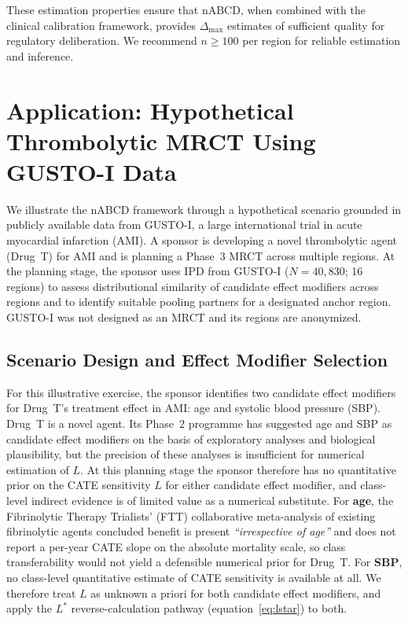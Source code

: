 \documentclass[AMA,Times1COL]{WileyNJDv5}
\begin{document}
These estimation properties ensure that nABCD, when combined with the clinical calibration framework, provides $\Delta_{\max}$ estimates of sufficient quality for regulatory deliberation. We recommend $n \geq 100$ per region for reliable estimation and inference.

\section{Application: Hypothetical Thrombolytic MRCT Using GUSTO-I Data}\label{sec:application}

We illustrate the nABCD framework through a hypothetical scenario grounded in publicly available data from GUSTO-I, a large international trial in acute myocardial infarction (AMI). A sponsor is developing a novel thrombolytic agent (Drug~T) for AMI and is planning a Phase~3 MRCT across multiple regions. At the planning stage, the sponsor uses IPD from GUSTO-I ($N = 40{,}830$; 16 regions)\cite{gusto1993} to assess distributional similarity of candidate effect modifiers across regions and to identify suitable pooling partners for a designated anchor region. GUSTO-I was not designed as an MRCT and its regions are anonymized.

\subsection{Scenario Design and Effect Modifier Selection}\label{sec:app_scenario}

For this illustrative exercise, the sponsor identifies two candidate effect modifiers for Drug~T's treatment effect in AMI: age and systolic blood pressure (SBP). Drug~T is a novel agent. Its Phase~2 programme has suggested age and SBP as candidate effect modifiers on the basis of exploratory analyses and biological plausibility, but the precision of these analyses is insufficient for numerical estimation of $L$. At this planning stage the sponsor therefore has no quantitative prior on the CATE sensitivity $L$ for either candidate effect modifier, and class-level indirect evidence is of limited value as a numerical substitute. For \textbf{age}, the Fibrinolytic Therapy Trialists' (FTT) collaborative meta-analysis of existing fibrinolytic agents\cite{ftt1994} concluded benefit is present \emph{``irrespective of age''} and does not report a per-year CATE slope on the absolute mortality scale, so class transferability would not yield a defensible numerical prior for Drug~T. For \textbf{SBP}, no class-level quantitative estimate of CATE sensitivity is available at all. We therefore treat $L$ as unknown a priori for both candidate effect modifiers, and apply the $L^*$ reverse-calculation pathway (equation~\ref{eq:lstar}) to both.
\end{document}
